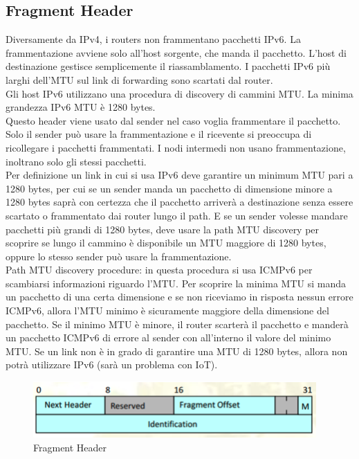 \documentclass{article}
\begin{document}
\subsection{Fragment Header}
Diversamente da IPv4, i routers non frammentano pacchetti IPv6.
La frammentazione avviene solo all’host sorgente, che manda il pacchetto. L’host di destinazione gestisce semplicemente il riassamblamento. I pacchetti IPv6 più larghi dell’MTU sul link di forwarding sono scartati dal router. \\
Gli host IPv6 utilizzano una procedura di discovery di cammini MTU.
La minima grandezza IPv6 MTU è 1280 bytes. \\
Questo header viene usato dal sender nel caso voglia frammentare il pacchetto. Solo il sender può usare la frammentazione e il ricevente si preoccupa di ricollegare i pacchetti frammentati. I nodi intermedi non usano frammentazione, inoltrano solo gli stessi pacchetti. \\
Per definizione un link in cui si usa IPv6 deve garantire un minimum MTU pari a 1280 bytes, per cui se un sender manda un pacchetto di dimensione minore a 1280 bytes saprà con certezza che il pacchetto arriverà a destinazione senza essere scartato o frammentato dai router lungo il path.
E se un sender volesse mandare pacchetti più grandi di 1280 bytes, deve usare la path MTU discovery per scoprire se lungo il cammino è disponibile un MTU maggiore di 1280 bytes, oppure lo stesso sender può usare la frammentazione. \\
Path MTU discovery procedure: in questa procedura si usa ICMPv6 per scambiarsi informazioni riguardo l’MTU. Per scoprire la minima MTU si manda un pacchetto di una certa dimensione e se non riceviamo in risposta nessun errore ICMPv6, allora l’MTU minimo è sicuramente maggiore della dimensione del pacchetto. Se il minimo MTU è minore, il router scarterà il pacchetto e manderà un pacchetto ICMPv6 di errore al sender con all’interno il valore del minimo MTU.
Se un link non è in grado di garantire una MTU di 1280 bytes, allora non potrà utilizzare IPv6 (sarà un problema con IoT).

\begin{figure}[H]
\centering
\includegraphics[scale=0.5]{figures/fragment header.png}
\caption{Fragment Header}
\end{figure}
\end{document}
